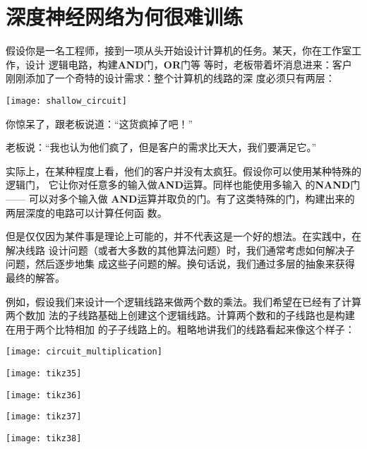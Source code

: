 
\chapter{深度神经网络为何很难训练}
\label{ch:WhyHardToTrain}

假设你是一名工程师，接到一项从头开始设计计算机的任务。某天，你在工作室工作，设计
逻辑电路，构建{\bfseries\SourceSerifPro AND}门，{\bfseries\SourceSerifPro OR}门等
等时，老板带着坏消息进来：客户刚刚添加了一个奇特的设计需求：整个计算机的线路的深
度必须只有两层：
\begin{center}
  \texttt{[image: shallow\_circuit]}
\end{center}

你惊呆了，跟老板说道：“这货疯掉了吧！”
 
老板说：“我也认为他们疯了，但是客户的需求比天大，我们要满足它。”
 
实际上，在某种程度上看，他们的客户并没有太疯狂。假设你可以使用某种特殊的逻辑门，
它让你对任意多的输入做{\bfseries\SourceSerifPro AND}运算。同样也能使用多输入
的{\bfseries\SourceSerifPro NAND}门 —— 可以对多个输入做{\bfseries\SourceSerifPro
  AND}运算并取负的门。有了这类特殊的门，构建出来的两层深度的电路可以计算任何函
数。

但是仅仅因为某件事是理论上可能的，并不代表这是一个好的想法。在实践中，在解决线路
设计问题（或者大多数的其他算法问题）时，我们通常考虑如何解决子问题，然后逐步地集
成这些子问题的解。换句话说，我们通过多层的抽象来获得最终的解答。

例如，假设我们来设计一个逻辑线路来做两个数的乘法。我们希望在已经有了计算两个数加
法的子线路基础上创建这个逻辑线路。计算两个数和的子线路也是构建在用于两个比特相加
的子子线路上的。粗略地讲我们的线路看起来像这个样子：
\begin{center}
  \texttt{[image: circuit\_multiplication]}
\end{center}

\begin{center}
  \texttt{[image: tikz35]}
\end{center}

\begin{center}
  \texttt{[image: tikz36]}
\end{center}

\begin{center}
  \texttt{[image: tikz37]}
\end{center}

\begin{center}
  \texttt{[image: tikz38]}
\end{center}

